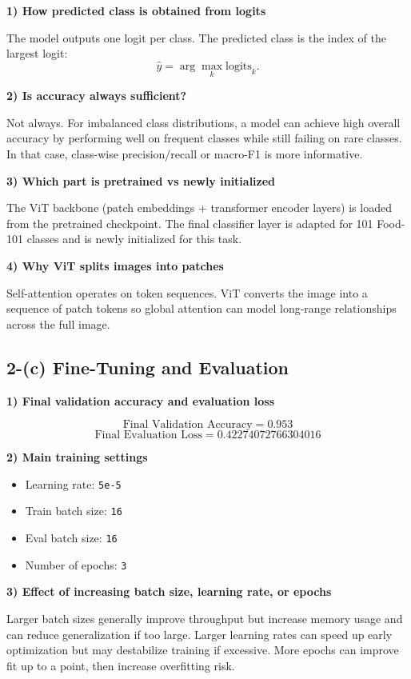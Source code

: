 \documentclass[11pt]{article}
\begin{document}
\textbf{1) How predicted class is obtained from logits}

The model outputs one logit per class. The predicted class is the index of the largest logit:
\[
\hat{y} = \arg\max_k \text{logits}_k.
\]

\textbf{2) Is accuracy always sufficient?}

Not always. For imbalanced class distributions, a model can achieve high overall accuracy by performing well on frequent classes while still failing on rare classes. In that case, class-wise precision/recall or macro-F1 is more informative.

\textbf{3) Which part is pretrained vs newly initialized}

The ViT backbone (patch embeddings + transformer encoder layers) is loaded from the pretrained checkpoint. The final classifier layer is adapted for 101 Food-101 classes and is newly initialized for this task.

\textbf{4) Why ViT splits images into patches}

Self-attention operates on token sequences. ViT converts the image into a sequence of patch tokens so global attention can model long-range relationships across the full image.

\subsection{2-(c) Fine-Tuning and Evaluation}

\textbf{1) Final validation accuracy and evaluation loss}

\[
\text{Final Validation Accuracy} = 0.953
\]
\[
\text{Final Evaluation Loss} = 0.42274072766304016
\]

\textbf{2) Main training settings}

\begin{itemize}
    \item Learning rate: \texttt{5e-5}
    \item Train batch size: \texttt{16}
    \item Eval batch size: \texttt{16}
    \item Number of epochs: \texttt{3}
\end{itemize}

\textbf{3) Effect of increasing batch size, learning rate, or epochs}

Larger batch sizes generally improve throughput but increase memory usage and can reduce generalization if too large. Larger learning rates can speed up early optimization but may destabilize training if excessive. More epochs can improve fit up to a point, then increase overfitting risk.
\end{document}
